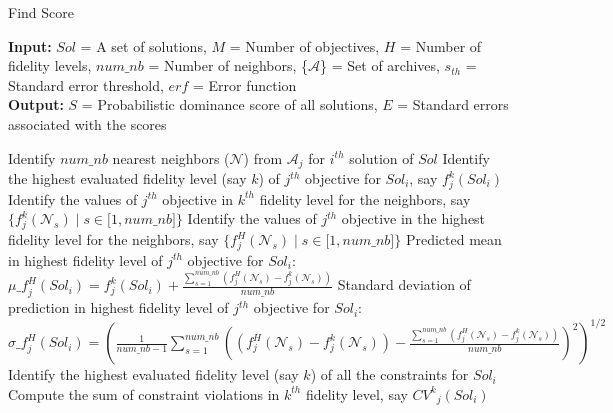 \begin{minipage}[0.9\textheight]{0.95\columnwidth}
	\begin{spacing}{0.7}
		\begin{algorithm}[H]\footnotesize
			\caption{Find Score}
			\textbf{Input:} $Sol$\hspace{1mm} = A set of solutions, $M$\hspace{1mm} = Number of objectives, $H$\hspace{1mm} = Number of fidelity levels, $num\_nb$\hspace{1mm} = Number of neighbors, \{$\mathcal{A}$\}\hspace{1mm} = Set of archives, $s_{th}$\hspace{1mm} = Standard error threshold, $erf$\hspace{1mm} = Error function\\
			\textbf{Output:} $S$\hspace{1mm} =  Probabilistic dominance score of all solutions, $E$\hspace{1mm} =  Standard errors associated with the scores
			\begin{algorithmic}[1]
				\STATE Identify $num\_nb$ nearest neighbors ($\mathcal{N}$) from $\mathcal{A}_j$ for $i^{th}$ solution of $Sol$
				\STATE Identify the highest evaluated fidelity level (say $k$) of $j^{th}$ objective for $Sol_i$, say $f^k_j (Sol_i)$ 
				\STATE Identify the values of $j^{th}$ objective in $k^{th}$ fidelity level for the neighbors, say $\{f^k_j (\mathcal{N}_s) \mid s\in\lbrack 1,num\_nb\rbrack\}$
				\STATE Identify the values of $j^{th}$ objective in the highest fidelity level for the neighbors, say $\{f^H_j (\mathcal{N}_s)\mid s\in\lbrack 1,num\_nb\rbrack\}$
				\STATE Predicted mean in highest fidelity level of $j^{th}$ objective for $Sol_i$: ${\mu\_f}^H_j (Sol_i) = f^k_j (Sol_i) + \frac{\sum_{s = 1}^{num\_nb} (f^H_j (\mathcal{N}_s) - f^k_j (\mathcal{N}_s))}{num\_nb}$
				\STATE Standard deviation of prediction in highest fidelity level of $j^{th}$ objective for $Sol_i$: ${\sigma\_f}^H_j (Sol_i) = (\frac{1}{num\_nb - 1} \sum_{s = 1}^{num\_nb} ((f^H_j (\mathcal{N}_s) - f^k_j (\mathcal{N}_s)) - \frac{\sum_{s = 1}^{num\_nb} (f^H_j (\mathcal{N}_s) - f^k_j (\mathcal{N}_s))}{num\_nb})^2)^{1/2}$
				\ELSE
				\STATE Identify the highest evaluated fidelity level (say $k$) of all the constraints for $Sol_i$
				\STATE Compute the sum of constraint violations in $k^{th}$ fidelity level, say ${CV^k}_j (Sol_i)$

\end{algorithmic}
\end{algorithm}
\end{spacing}
\end{minipage}
